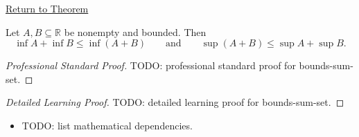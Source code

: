 \newpage
{}
\label{prf:bounds-sum-set}

\begin{remark*}[Return]
\hyperref[prop:bounds-sum-set]{Return to Theorem}
\end{remark*}

\begin{theorem*}
Let $A,B\subseteq\mathbb{R}$ be nonempty and bounded. Then
\[
  \inf A+\inf B\le \inf(A+B)
  \qquad\text{and}\qquad
  \sup(A+B)\le \sup A+\sup B.
\]
\end{theorem*}

\begin{proof}[Professional Standard Proof]
\LRAProofBodyStart
TODO: professional standard proof for bounds-sum-set.
\end{proof}

\begin{proof}[Detailed Learning Proof]
\LRAProofBodyStart
TODO: detailed learning proof for bounds-sum-set.
\end{proof}

\begin{remark*}
\end{remark*}

\begin{dependencies}
\begin{itemize}
  \item TODO: list mathematical dependencies.
\end{itemize}
\end{dependencies}

\clearpage
